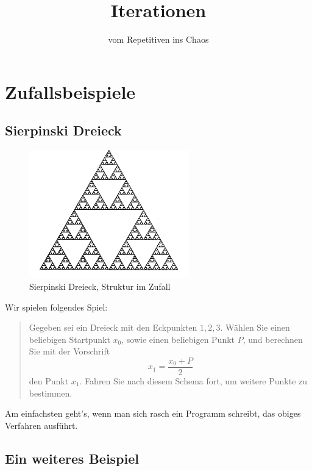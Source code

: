 \documentclass[%
11pt,%
twoside,%
titlepage,%
german,%
headsepline%
]{scrartcl}
\title{Iterationen}
\subtitle{vom Repetitiven ins Chaos}
\author{}
\date{}
\begin{document}
\maketitle
\tableofcontents
\cleardoublepage

\section{\glqq Zufallsbeispiele\grqq}

\subsection{Sierpinski Dreieck}

\begin{figure}
  \centering

    \includegraphics[width=0.618\textwidth]{pictures/sierpinski}
\caption{Sierpinski Dreieck, Struktur im Zufall}
\end{figure}

Wir spielen folgendes Spiel:
\begin{quote}
Gegeben sei ein Dreieck mit den Eckpunkten $1,2,3$. Wählen Sie einen beliebigen Startpunkt $x_0$, sowie einen beliebigen Punkt $P$, und berechnen Sie mit der Vorschrift
$$x_1=\frac{x_0+P}{2}$$
den Punkt $x_1$. Fahren Sie nach diesem Schema fort, um weitere Punkte zu bestimmen.
\end{quote}

Am einfachsten geht's, wenn man sich rasch ein Programm schreibt, das obiges Verfahren ausführt.




\subsection{Ein weiteres Beispiel}
\end{document}
